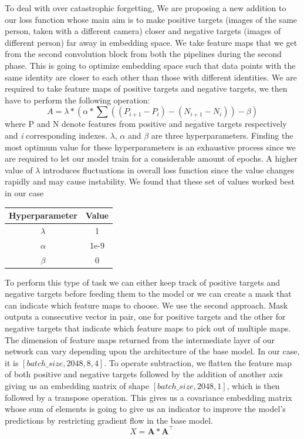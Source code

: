 \documentclass[10pt,twocolumn,letterpaper]{article}
\begin{document}
To deal with over catastrophic forgetting, We are proposing a new addition to our loss function whose main aim is to make positive targets (images of the same person, taken with a different camera) closer and negative targets (images of different person) far away in embedding space. We take feature maps that we get from the second convolution block from both the pipelines during the second phase. This is going to optimize embedding space such that data points with the same identity are closer to each other than those with different identities. We are required to take feature maps of positive targets and negative targets, we then have to perform the following operation:
\begin{equation}
A = \lambda*(\alpha*\sum((P_{i+1}-P_i)-(N_{i+1}-N_i))-\beta)
\end{equation}
where P and N denote features from positive and negative targets respectively and \textit{i} corresponding indexes.
$\lambda $, $\alpha$ and $\beta$ are three hyperparameters. Finding the most optimum value for these hyperparameters is an exhaustive process since we are required to let our model train for a considerable amount of epochs. A higher value of $\lambda$ introduces fluctuations in overall loss function since the value changes rapidly and may cause instability. We found that these set of values worked best in our case 
\begin{center}
 \begin{tabular}{||c c||} 
 \hline
 Hyperparameter & Value \\ [0.5ex] 
 \hline\hline
 $\lambda$ & 1 \\ 
 \hline
 $\alpha$ & 1e-9 \\ 
 \hline
 $\beta$ & 0 \\ 
 \hline
\end{tabular}
\end{center}

To perform this type of task we can either keep track of positive targets and negative targets before feeding them to the model or we can create a mask that can indicate which feature maps to choose. We use the second approach. Mask outputs a consecutive vector in pair, one for positive targets and the other for negative targets that indicate which feature maps to pick out of multiple maps. The dimension of feature maps returned from the intermediate layer of our network can vary depending upon the architecture of the base model. In our case, it is $ [batch\_size,2048,8,4] $. To operate subtraction, we flatten the feature map of both positive and negative targets followed by the addition of another axis giving us an embedding matrix of shape $[batch\_size,2048,1]$, which is then followed by a transpose operation.
This gives us a covariance embedding matrix whose sum of elements is going to give us an indicator to improve the model's predictions by restricting gradient flow in the base model.
\begin{equation}
X = \mathbf{A}*\mathbf{A}^\intercal\ 
\end{equation}
\end{document}

